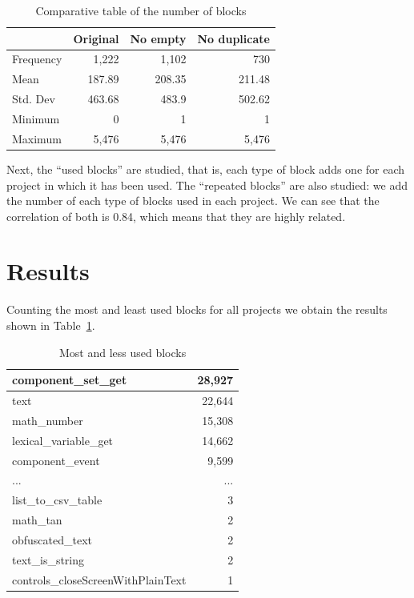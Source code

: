\documentclass[a4paper]{article}
\begin{document}

\begin{table}[ht]
\begin{center}
\caption{Comparative table of the number of blocks}

\bigskip

\begin{tabular}{|l|r|r|r|}
\hline
& Original & No empty & No duplicate \\ \hline
Frequency & 1,222 & 1,102 & 730\\ \hline
Mean & 187.89 & 208.35 & 211.48\\ \hline
Std. Dev & 463.68 & 483.9 & 502.62 \\ \hline
Minimum & 0 & 1 & 1\\ \hline
Maximum & 5,476 & 5,476 & 5,476 \\ \hline
\end{tabular}
\end{center}
\end{table}

Next, the ``used blocks'' are studied, that is, each type of block adds one for each project in which it has been used. The ``repeated blocks'' are also studied: we add the number of each type of blocks used in each project. We can see that the correlation of both is 0.84, which means that they are highly related.

\section{Results}

Counting the most and least used blocks for all projects we obtain the results shown in Table~\ref{tab:most-least}. 

\begin{table}[ht]
\begin{center}
\caption{Most and less used blocks}
\bigskip
\label{tab:most-least}
\begin{tabular}{|l|r|}
\hline
component\_set\_get & 28,927\\ \hline
text & 22,644\\ \hline
math\_number & 15,308\\ \hline
lexical\_variable\_get & 14,662\\ \hline
component\_event & 9,599\\ \hline
... & ... \\ \hline
list\_to\_csv\_table & 3\\ \hline
math\_tan & 2\\ \hline
obfuscated\_text & 2\\ \hline
text\_is\_string & 2\\ \hline
controls\_closeScreenWithPlainText & 1\\ \hline
\end{tabular}
\end{center}
\end{table}
\end{document}
